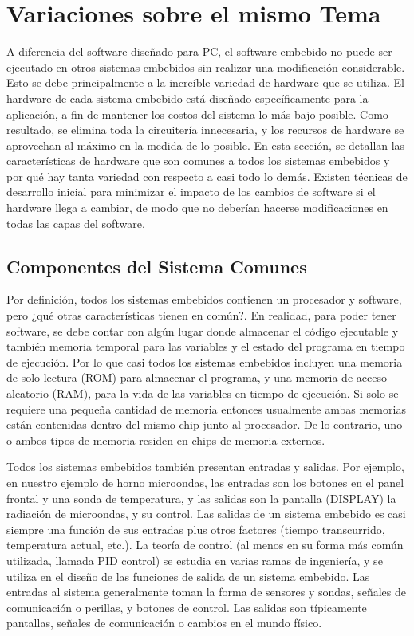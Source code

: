 \documentclass[output=paper, 
colorlinks,
citecolor=brown,
newtxmath
]{langscibook}
\begin{document}
\section {Variaciones sobre el mismo Tema}




A diferencia del software diseñado para PC, el software embebido no puede ser ejecutado
en otros sistemas embebidos sin realizar una modificación considerable. Esto se debe 
principalmente a la increíble variedad de hardware que se utiliza.
El hardware de cada sistema embebido está diseñado específicamente para la aplicación, 
a fin de mantener los costos del sistema lo más bajo posible. Como resultado, 
se elimina toda la circuitería innecesaria, y los recursos de hardware se 
aprovechan al máximo en la medida de lo posible.
En esta sección, se detallan las características de hardware que son comunes 
a todos los sistemas embebidos y por qué hay tanta variedad con respecto a casi 
todo lo demás. Existen técnicas de desarrollo inicial para minimizar el impacto de 
los cambios de software si el hardware llega a cambiar, de modo que no deberían
hacerse modificaciones en todas las capas del software.



\subsection {Componentes del Sistema Comunes}


Por definición, todos los sistemas embebidos contienen un procesador y software, 
pero ¿qué otras características tienen en común?. En realidad, para poder tener software, 
se debe contar con algún lugar donde almacenar el código ejecutable y también
memoria temporal para las variables y el estado del programa en tiempo de ejecución. 
Por lo que casi todos los sistemas embebidos incluyen una memoria de solo lectura (ROM) 
para almacenar el programa, y una memoria de acceso aleatorio (RAM), para la vida
de las variables en tiempo de ejecución. Si solo se requiere una pequeña cantidad 
de memoria entonces usualmente ambas memorias están contenidas dentro del mismo chip junto al
procesador.
De lo contrario, uno o ambos tipos de memoria residen en chips de memoria externos.

Todos los sistemas embebidos también presentan entradas y salidas. Por ejemplo, 
en nuestro ejemplo de horno microondas, las entradas son los botones en el panel 
frontal y una sonda de temperatura, y las salidas son la pantalla (DISPLAY) 
la radiación de microondas, y su control. Las salidas de un sistema embebido es 
casi siempre una función de sus entradas plus otros factores (tiempo transcurrido, 
temperatura actual, etc.). La teoría de control (al menos en su forma
más común utilizada, llamada PID control)
se estudia en varias ramas de ingeniería, y se utiliza en el diseño de las 
funciones de salida de un sistema embebido. Las entradas al sistema generalmente toman 
la forma de sensores y sondas, señales de comunicación o perillas, y botones de control. 
Las salidas son típicamente pantallas, señales de comunicación o cambios en el mundo físico.
\end{document}
